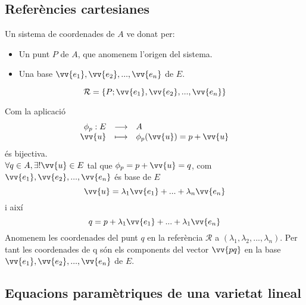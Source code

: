 \subsection{Referències cartesianes}
\label{ss_refcar}

\begin{defn}
	Un sistema de coordenades de $A$ ve donat per:
	\begin{itemize}
		\item Un punt $P$ de $A$, que anomenem l'origen del sistema.
		\item Una base $\vv{e_{1}},\vv{e_{2}},...,\vv{e_{n}}$ de $E$.
	\end{itemize}
	$$\mathcal{R}=\{P;\vv{e_{1}},\vv{e_{2}},...,\vv{e_{n}}\}$$
	
	Com la aplicació \\
	$$\begin{array}{rcl}
		\phi_{p} :E	& \longrightarrow	& A 		\\
		\vv{u}		& \longmapsto		& \phi_{p}(\vv{u})=p+\vv{u}	\\
	\end{array}$$
	és bijectiva. \\
	$\forall q\in A, \exists !\vv{u}\in E$ tal que $\phi_{p}=p+\vv{u}=q$, com $\vv{e_{1}},\vv{e_{2}},...,\vv{e_{n}}$ és base de $E$
	$$\vv{u}=\lambda_{1}\vv{e_1}+...+\lambda_{n}\vv{e_{n}}$$
	i així
	$$q=p+\lambda_{1}\vv{e_{1}}+...+\lambda_{1}\vv{e_{n}}$$ 
	Anomenem les coordenades del punt $q$ en la referència $\mathcal{R}$ a $(\lambda_{1},\lambda_{2},...,\lambda_{n})$. Per tant les coordenades de q són els components del vector $\vv{pq}$ en la base $\vv{e_{1}},\vv{e_{2}},...,\vv{e_{n}}$ de $E$.
\end{defn}

\subsection{Equacions paramètriques de una varietat lineal}
\label{ss_eqimvl}

